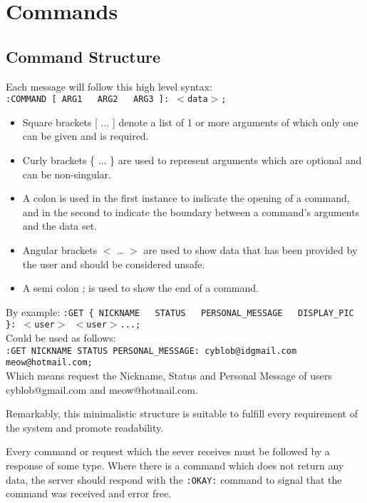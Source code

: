 \section{Commands}

\subsection{Command Structure}

Each message will follow this high level syntax: \\
\texttt{:COMMAND [ ARG1 \ \vline \ ARG2 \ \vline \ ARG3 ]: $<$data$>$;}

\begin{itemize}

\item{Square brackets [ ... ] denote a list of 1 or more arguments of which only one can be given and is required.}  

\item{Curly brackets \{ ... \} are used to represent arguments which are optional and can be non-singular.}

\item{A colon is used in the first instance to indicate the opening of a command, and in the second to indicate the boundary between a command's arguments and the data set.}

\item{Angular brackets $<$ … $>$ are used to show data that has been provided by the user and should be considered unsafe.}

\item{A semi colon ; is used to show the end of a command.}

\end{itemize}

By example:
\texttt{:GET \{ NICKNAME \ \vline \ STATUS \ \vline \ PERSONAL\_MESSAGE \ \vline \ DISPLAY\_PIC \}: $<$user$>$ $<$user$>$...;}\\
Could be used as follows: \\
\texttt{:GET NICKNAME STATUS PERSONAL\_MESSAGE: cyblob@idgmail.com meow@hotmail.com;} \\
Which means request the Nickname, Status and Personal Message of users cyblob@gmail.com and meow@hotmail.com.

Remarkably, this minimalistic structure is suitable to fulfill every requirement of the system and promote readability.

Every command or request which the sever receives must be followed by a response of some type. Where there is a command which does not return any data, the server should respond with the \texttt{:OKAY:} command to signal that the command was received and error free.

